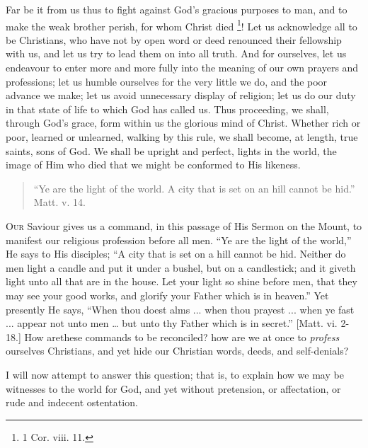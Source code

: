 Far be it from us thus to fight against God's gracious
purposes to man, and to make the weak brother perish, for
whom Christ died \footnote{1 Cor. viii. 11.}! Let us acknowledge
all to be Christians, who have not by open word or deed
renounced their fellowship with us, and let us try to
lead them on into all truth. And for ourselves, let us
endeavour to enter more and more fully into the meaning
of our own prayers and professions; let us humble
ourselves for the very little we do, and the poor advance
we make; let us avoid unnecessary display of religion;
let us do our duty in that state of life to which God has
called us. Thus proceeding, we shall, through God's
grace, form within us the glorious mind of Christ.
Whether rich or poor, learned or unlearned, walking by
this rule, we shall become, at length, true saints, sons
of God. We shall be upright and perfect, lights in the
world, the image of Him who died that we might be
conformed to His likeness.


\begin{quote}

``Ye are the light of the world. A city that
is set on an hill cannot be hid.'' Matt. v. 14.

\end{quote}

O\textsc{ur} Saviour gives us a command, in this passage of His
Sermon on the Mount, to manifest our religious profession
before all men. ``Ye are the light of the
world,'' He says to His disciples; ``A city that
is set on a hill cannot be hid. Neither do men light a
candle and put it under a bushel, but on a candlestick;
and it giveth light unto all that are in the house. Let
your light so shine before men, that they may see your
good works, and glorify your Father which is in
heaven.'' Yet presently He says, ``When thou
doest alms ... when thou prayest ... when ye fast ...
appear not unto men … but unto thy Father which is
in secret.'' [Matt. vi. 2-18.] How are\textbf{}these
commands to be reconciled? how are we at once to \emph{profess}
ourselves Christians, and yet hide our Christian words,
deeds, and self-denials?

I will now attempt to answer this question; that is, to explain how we may be witnesses to the world for God,
and yet without pretension, or affectation, or rude and
indecent ostentation.


